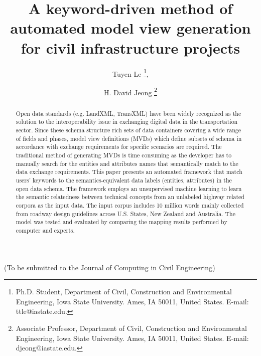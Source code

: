 \documentclass[Journal, InsideFigs, DoubleSpace]{ascelike} %
\begin{document}
\title{A keyword-driven method of automated model view generation for civil infrastructure projects}

%
\author{
Tuyen Le
\thanks{
Ph.D. Student, Department of Civil, Construction and Environmental Engineering, Iowa State University. Ames, IA 50011, United States. E-mail: ttle@iastate.edu.},
\and
H. David Jeong
\thanks{Associate Professor, Department of Civil, Construction and Environmental Engineering, Iowa State University. Ames, IA 50011, United States. E-mail: djeong@iastate.edu.}
 }
\maketitle
%
\begin{center}
(To be submitted to the Journal of Computing in Civil Engineering) 
\end{center}
\begin{abstract} %
Open data standards (e.g. LandXML, TransXML) have been widely recognized as the solution to the interoperability issue in exchanging digital data in the transportation sector. Since these schema structure rich sets of data containers covering a wide range of fields and phases, model view definitions (MVDs) which define subsets of schema in accordance with exchange requirements for specific scenarios are required. The traditional method  of generating MVDs is time consuming as the developer has to manually search for the entities and attributes names that semantically match to the data exchange requirements. This paper presents an automated framework that match users' keywords to the semantics-equivalent data labels (entities, attributes) in the open data schema. The framework employs an unsupervised machine learning to learn the semantic relatedness between technical concepts from an unlabeled highway related corpora as the input data. The input corpus includes 10 million words mainly collected from roadway design guidelines across U.S. States, New Zealand and Australia. The model was tested and evaluated by comparing the mapping results performed by computer and experts.   
\end{abstract}
%



\end{document}

